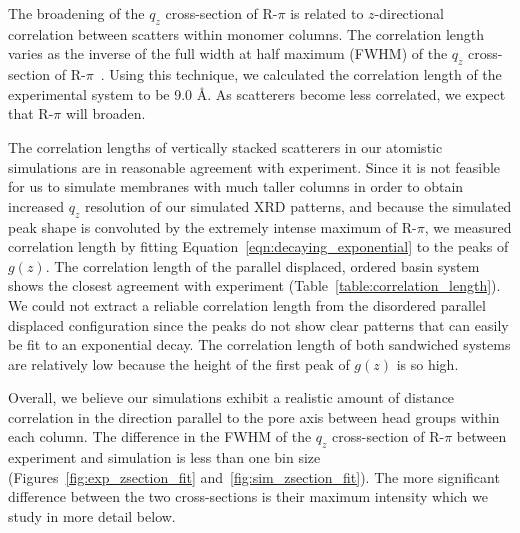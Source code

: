 \documentclass[journal=jpcbfk,manuscript=article]{achemso}
\begin{document}
  The broadening of the $q_z$ cross-section of R-$\pi$ is related to
  $z$-directional correlation between scatters within monomer columns. The
  correlation length varies as the inverse of the full width at half maximum
  (FWHM) of the $q_z$ cross-section of R-$\pi$~\cite{young_highly_2013-1}. Using
  this technique, we calculated the correlation length of the experimental 
  system to be 9.0 \AA. As scatterers become less correlated, we expect that
  R-$\pi$ will broaden.

  The correlation lengths of vertically stacked scatterers in our atomistic
  simulations are in reasonable agreement with experiment. Since it is not
  feasible for us to simulate membranes with much taller columns in order to
  obtain increased $q_z$ resolution of our simulated XRD patterns, and because
  the simulated peak shape is convoluted by the extremely intense maximum of
  R-$\pi$, we measured correlation length by fitting
  Equation~\ref{eqn:decaying_exponential} to the peaks of $g(z)$. The correlation
  length of the parallel displaced, ordered basin system shows the closest
  agreement with experiment (Table~\ref{table:correlation_length}). 
  We could not extract a reliable correlation length from the disordered
  parallel displaced configuration since the peaks do not show clear patterns
  that can easily be fit to an exponential decay. The correlation length of both
  sandwiched systems are relatively low because the height of the first peak of
  $g(z)$ is so high. 
  
  Overall, we believe our simulations exhibit a realistic amount of distance
  correlation in the direction parallel to the pore axis between head groups
  within each column. The difference in the FWHM of the $q_z$ cross-section of
  R-$\pi$ between experiment and simulation is less than one bin size
  (Figures~\ref{fig:exp_zsection_fit} and~\ref{fig:sim_zsection_fit}). The more
  significant difference between the two cross-sections is their maximum intensity
  which we study in more detail below.
  
\end{document}
